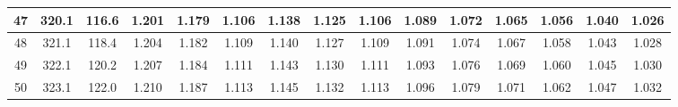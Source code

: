 \documentclass[12pt,a4paper,twoside]{article}
\begin{document}
\begin{center}
\begin{longtable}{ c c c | c c c c c c c c c c c c}
 47 & 320.1 & 116.6 & 1.201 & 1.179 & 1.106 & 1.138 & 1.125 & 1.106 & 1.089 & 1.072 & 1.065 & 1.056 & 1.040 & 1.026 \\ \hline   
 
 48 & 321.1 & 118.4 & 1.204 & 1.182 & 1.109 & 1.140 & 1.127 & 1.109 & 1.091 & 1.074 & 1.067 & 1.058 & 1.043 & 1.028 \\ \hline   
 
 49 & 322.1 & 120.2 & 1.207 & 1.184 & 1.111 & 1.143 & 1.130 & 1.111 & 1.093 & 1.076 & 1.069 & 1.060 & 1.045 & 1.030 \\ \hline   
 
 50 & 323.1 & 122.0 & 1.210 & 1.187 & 1.113 & 1.145 & 1.132 & 1.113 & 1.096 & 1.079 & 1.071 & 1.062 & 1.047 & 1.032 \\ \hline  
  \end{longtable}
\end{center}
\end{document}
